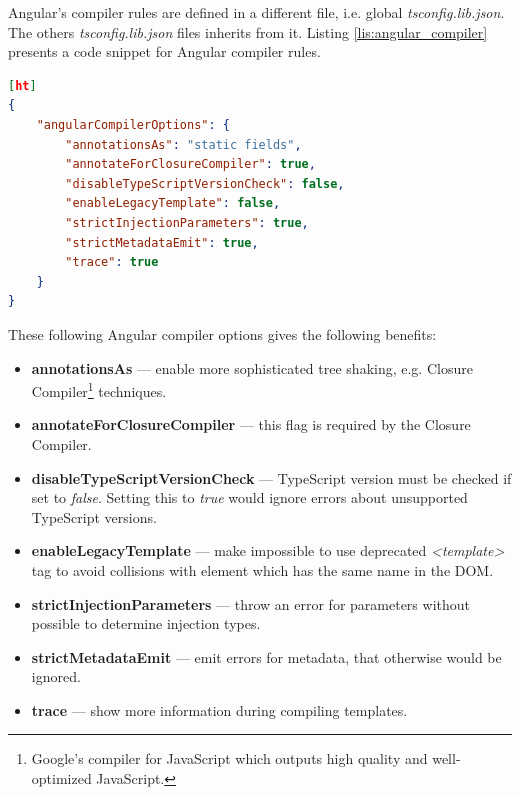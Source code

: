 \documentclass{article} %
\begin{document}
\newline
Angular's compiler rules are defined in a different file, i.e. global \textit{tsconfig.lib.json}. The others \textit{tsconfig.lib.json} files inherits from it. Listing \ref{lis:angular_compiler} presents a code snippet for Angular compiler rules.
\begin{lstlisting}[language=json,firstnumber=1,label={lis:angular_compiler},caption={Important rules for Angular's\index{Angular} compiler.}][ht]
{
    "angularCompilerOptions": {
        "annotationsAs": "static fields",
        "annotateForClosureCompiler": true,
        "disableTypeScriptVersionCheck": false,
        "enableLegacyTemplate": false,
        "strictInjectionParameters": true,
        "strictMetadataEmit": true,
        "trace": true
    }
}
\end{lstlisting}
These following Angular compiler options gives the following benefits:
\begin{itemize}
    \item \textbf{annotationsAs} --- enable more sophisticated tree shaking, e.g. Closure Compiler\footnote{Google's compiler for JavaScript which outputs high quality and well-optimized JavaScript.} techniques.
    \item \textbf{annotateForClosureCompiler} --- this flag is required by the Closure Compiler.
    \item \textbf{disableTypeScriptVersionCheck} --- TypeScript version must be checked if set to \textit{false}. Setting this to \textit{true} would ignore errors about unsupported TypeScript versions.
    \item \textbf{enableLegacyTemplate} --- make impossible to use deprecated \textit{<template>} tag to avoid collisions with element which has the same name in the DOM.
    \item \textbf{strictInjectionParameters} --- throw an error for parameters without possible to determine injection types.
    \item \textbf{strictMetadataEmit} --- emit errors for metadata, that otherwise would be ignored.
    \item \textbf{trace} --- show more information during compiling templates.
\end{itemize}
\end{document}
